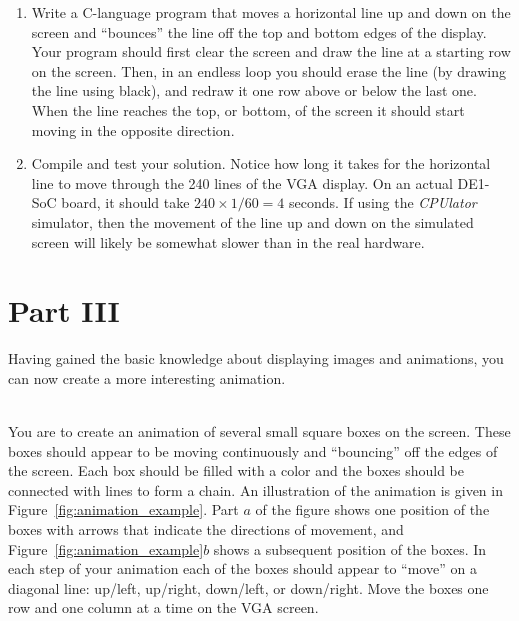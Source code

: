 \documentclass[epsfig,10pt,fullpage]{article}
\begin{document}
\begin{enumerate}

\item Write a C-language program that moves a horizontal line up and down on the screen and 
``bounces'' the line off the top and bottom edges of the display. Your program should first 
clear the screen and draw the line at a starting row on the screen. Then, in an endless
loop you should erase the line (by drawing the line using black), and redraw it one row
above or below the last one.  When the line reaches the top, or bottom, of the screen 
it should start moving in the opposite direction.

\item Compile and test your solution. Notice how long it takes for the 
horizontal line to move through the 240 lines of the VGA display. On an actual DE1-SoC
board, it should take $240 \times 1/60 = 4$ seconds. If using the {\it CPUlator}
simulator, then the movement of the line up and down on the simulated screen will likely
be somewhat slower than in the real hardware.
\end{enumerate}

\section*{Part III}
Having gained the basic knowledge about displaying images and animations, you can now create 
a more interesting animation.

~\\
You are to create an animation of several small square boxes on the screen. These boxes 
should appear to be moving continuously and ``bouncing'' off the edges of the screen. Each
box should be filled with a color and the
boxes should be connected with lines to form a chain. An illustration of the animation 
is given in Figure~\ref{fig:animation_example}. Part $a$ of the figure shows one position
of the boxes with arrows that indicate the directions of movement, and 
Figure~\ref{fig:animation_example}$b$ shows a subsequent position of the boxes. 
In each step of your animation each of the boxes should appear to ``move'' on a diagonal 
line: up/left, up/right, down/left, or down/right. Move the boxes one
row and one column at a time on the VGA screen.
\end{document}
